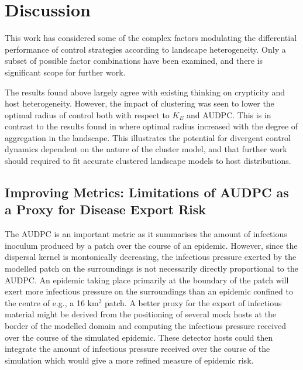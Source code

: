 \documentclass[11pt,letterpaper]{article}
\begin{document}
{%
  
\section*{Discussion}

This work has considered some of the complex factors modulating the differential performance of control strategies according to landscape heterogeneity. Only a subset of possible factor combinations have been examined, and there is significant scope for further work. 

The results found above largely agree with existing thinking on crypticity and host heterogeneity. However, the impact of clustering was seen to lower the optimal radius of control both with respect to $K_E$ and AUDPC. This is in contrast to the results found in \cite{Parnell2010} where optimal radius increased with the degree of aggregation in the landscape. This illustrates the potential for divergent control dynamics dependent on the nature of the cluster model, and that further work should required to fit accurate clustered landscape models to host distributions.

\subsection*{Improving Metrics: Limitations of AUDPC as a Proxy for Disease Export Risk}

The AUDPC is an important metric as it summarises the amount of infectious inoculum produced by a patch over the course of an epidemic. However, since the dispersal kernel is montonically decreasing, the infectious pressure exerted by the modelled patch on the surroundings is not necessarily directly proportional to the AUDPC. An epidemic taking place primarily at the boundary of the patch will exert more infectious pressure on the surroundings than an epidemic confined to the centre of e.g., a 16 $\mathrm{km^{2}}$ patch. A better proxy for the export of infectious material might be derived from the positioning of several mock hosts at the border of the modelled domain and computing the infectious pressure received over the course of the simulated epidemic. These detector hosts could then integrate the amount of infectious pressure received over the course of the simulation which would give a more refined measure of epidemic risk. 


}
\end{document}

